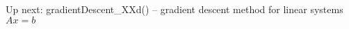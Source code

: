 
\begin{DoxyRefList}
\item[\label{todo__todo000001}%
\Hypertarget{todo__todo000001}%
Namespace \mbox{\hyperlink{namespaceopt}{opt}} ]Up next\+: gradient\+Descent\+\_\+\+X\+Xd() -- gradient descent method for linear systems $Ax=b$ 
\end{DoxyRefList}